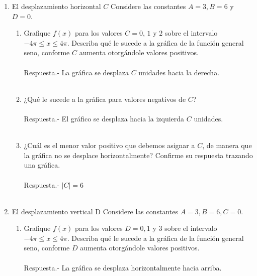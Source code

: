 \begin{enumerate}
\item El desplazamiento horizontal $C$ Considere las constantes $A = 3, B = 6$ y $D = 0$.
    \begin{enumerate}[\bfseries a)]

	\item Grafique $f(x)$ para los valores $C = 0$, $1$ y $2$ sobre el intervalo $-4\pi\leq x\leq 4\pi$. Describa qué le sucede a la gráfica de la función general seno, conforme $C$ aumenta otorgándole valores positivos.\\\\
	    Respuesta.-\; La gráfica se desplaza $C$ unidades hacia la derecha.\\\\

	\item ¿Qué le sucede a la gráfica para valores negativos de $C$?\\\\
	    Respuesta.-\; El gráfico se desplaza hacia la izquierda $C$ unidades.\\\\

	\item ¿Cuál es el menor valor positivo que debemos asignar a $C$, de manera que la gráfica no se desplace horizontalmente? Confirme su respuesta trazando una gráfica.\\\\
	    Respuesta.-\; $|C|=6$\\\\

	\end{enumerate}

\item El desplazamiento vertical D Considere las constantes $A = 3, B = 6, C = 0$.

    \begin{enumerate}[\bfseries a)]

	\item Grafique $f(x)$ para los valores $D = 0, 1$ y $3$ sobre el intervalo $-4\pi \leq x \leq 4\pi$. Describa qué le sucede a la gráfica de la función general seno, conforme $D$ aumenta otorgándole valores positivos.\\\\
	    Respuesta.-\; La gráfica se desplaza horizontalmente hacia arriba.\\\\


\end{enumerate}
\end{enumerate}
